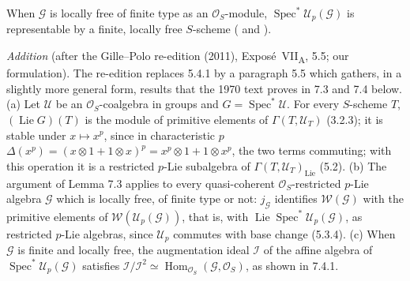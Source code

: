 When \(\mathcal G\) is locally free of finite type as an
\(\mathcal O_S\)-module, \(\operatorname{Spec}^{*}\mathcal U_p(\mathcal G)\)
is representable by a finite, locally free \(S\)-scheme ( and
).

\par\medskip\noindent{}%
\emph{Addition} (after the Gille--Polo re-edition (2011),
Expos\'e~VII\textsubscript{A}, 5.5; our formulation). The re-edition
replaces 5.4.1 by a paragraph 5.5 which gathers, in a slightly more
general form, results that the 1970 text proves in 7.3 and 7.4 below.
(a) Let \(\mathcal U\) be an \(\mathcal O_S\)-coalgebra in groups and
\(G=\operatorname{Spec}^{*}\mathcal U\). For every \(S\)-scheme \(T\),
\((\operatorname{Lie}G)(T)\) is the module of primitive elements of
\(\Gamma(T,\mathcal U_T)\) (3.2.3); it is stable under \(x\mapsto x^p\),
since in characteristic \(p\)
\(\Delta(x^p)=(x\otimes1+1\otimes x)^p=x^p\otimes1+1\otimes x^p\), the two
terms commuting; with this operation it is a restricted \(p\)-Lie
subalgebra of \(\Gamma(T,\mathcal U_T)_{\mathrm{Lie}}\) (5.2). (b) The
argument of Lemma 7.3 applies to every quasi-coherent
\(\mathcal O_S\)-restricted \(p\)-Lie algebra \(\mathcal G\) which is
locally free, of finite type or not: \(j_{\mathcal G}\) identifies
\(\mathcal W(\mathcal G)\) with the primitive elements of
\(\mathcal W(\mathcal U_p(\mathcal G))\), that is, with
\(\operatorname{Lie}\operatorname{Spec}^{*}\mathcal U_p(\mathcal G)\), as
restricted \(p\)-Lie algebras, since \(\mathcal U_p\) commutes with base
change (5.3.4). (c) When \(\mathcal G\) is finite and locally free, the
augmentation ideal \(\mathcal I\) of the affine algebra of
\(\operatorname{Spec}^{*}\mathcal U_p(\mathcal G)\) satisfies
\(\mathcal I/\mathcal I^2\simeq\operatorname{Hom}_{\mathcal O_S}
(\mathcal G,\mathcal O_S)\), as shown in 7.4.1.
